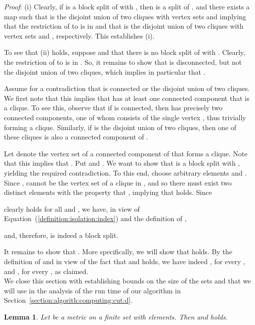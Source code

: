 \documentclass[12pt]{article}
\newtheorem{lemma}[prop]{Lemma}
\begin{document}
\noindent\textsl{Proof}:
(i) Clearly, if  is a block split of  with , then  
is a split of , and there exists 
a map  such that  is the disjoint union of two cliques with
vertex sets  and  implying that the restriction  of   to  is in  and that 
is the disjoint union of two cliques with vertex sets  and , respectively.
This establishes (i).

To see that (ii) holds, suppose  and that there is no
block split  of  with . 
Clearly, the restriction  of  to  is in .
So, it remains to show that  is disconnected, but 
not the disjoint union of two cliques, which implies in particular
that .

Assume for a contradiction that  is connected or
the disjoint union of two cliques. We first note that this implies that
 has at least one connected component that is a clique.
To see this, observe that if  is connected,
then  has precisely two connected components, one of whom
consists of the single vertex , thus trivially forming a clique.
Similarly, if  is the disjoint union of two cliques,
then one of these cliques is also a connected component of .

Let  denote the vertex set of a connected component of 
that forms a clique. Note that this implies that .
Put  and . 
We want to show that  is a block split with , yielding
the required contradiction. To this end, choose arbitrary elements  
and . Since ,  cannot be the vertex set of a
clique in , and so there must exist two distinct elements
 with the property that , implying that
 holds. Since

clearly holds for all  and ,
we have, in  view of Equation~(\ref{definition:isolation:index})
and the definition of , 

and, therefore,  is indeed a block split.

It remains to show that . More specifically, we will show
that  holds. By the definition
of  and in view of the fact that  and
 holds, we have indeed
,
for every , and
,
for every , as claimed.
\hfill\\

We close this section with establishing bounds on the size of the sets 
 and  that we will use in the analysis
of the run time of our algorithm in Section~\ref{section:algorith:computing:cut:d}. 

\begin{lemma}
\label{lemma:number:cut:points}
Let  be a metric on a finite set  with  elements.
Then   and  holds.
\end{lemma}
\end{document}
